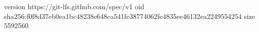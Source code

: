 version https://git-lfs.github.com/spec/v1
oid sha256:f0f8d37eb0ea1bc48238e648ca541fc38774062fe4835ee46132ea2249554254
size 5592560
